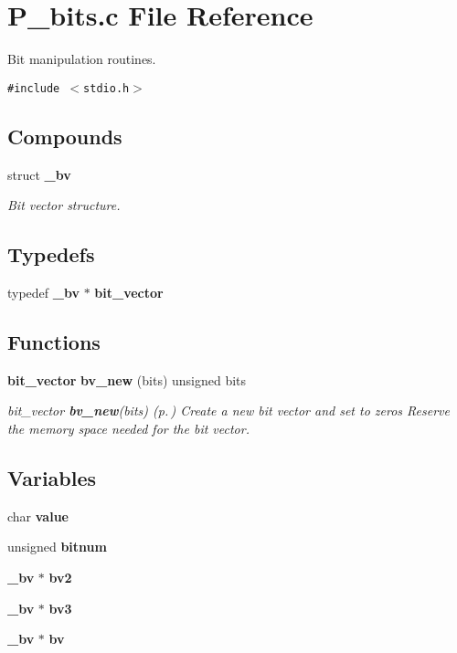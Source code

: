 \section{P\_\-bits.c File Reference}
\label{P__bits_8c}
Bit manipulation routines. 


{\tt \#include $<$stdio.h$>$}\par
\subsection*{Compounds}
\begin{CompactItemize}
\item 
struct {\bf \_\-bv}
\begin{CompactList}\small\item\em Bit vector structure.\item\end{CompactList}\end{CompactItemize}
\subsection*{Typedefs}
\begin{CompactItemize}
\item 
typedef {\bf \_\-bv} $\ast$ {\bf bit\_\-vector}
\end{CompactItemize}
\subsection*{Functions}
\begin{CompactItemize}
\item 
{\bf bit\_\-vector} {\bf bv\_\-new} (bits) unsigned bits
\begin{CompactList}\small\item\em bit\_\-vector {\bf bv\_\-new}(bits) {\rm (p.\,\pageref{P__bits_8c_a6})} Create a new bit vector and set to zeros Reserve the memory space needed for the bit vector.\item\end{CompactList}\end{CompactItemize}
\subsection*{Variables}
\begin{CompactItemize}
\item 
char {\bf value}
\item 
unsigned {\bf bitnum}
\item 
{\bf \_\-bv} $\ast$ {\bf bv2}
\item 
{\bf \_\-bv} $\ast$ {\bf bv3}
\item 
{\bf \_\-bv} $\ast$ {\bf bv}
\end{CompactItemize}


